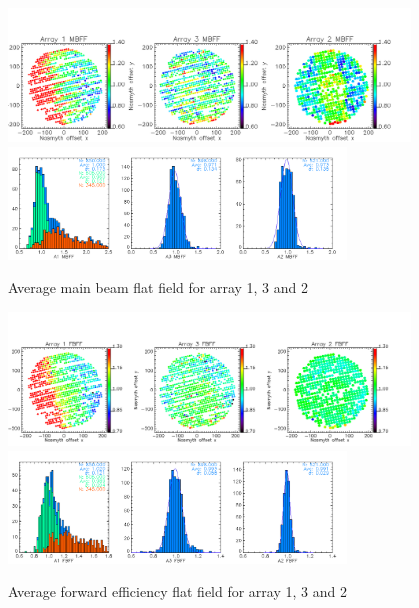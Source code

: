 \begin{figure}[ht] 
\begin{center}
  \includegraphics[width=0.95\textwidth]{Figures/FlatFields/Average_main_beam_flat_field_N2R9_10.png}
  \includegraphics[width=0.8\textwidth]{Figures/FlatFields/Histo_average_main_beam_flat_field_N2R9_10.png}
\caption{Average main beam flat field for array 1, 3 and 2}
 \label{fig:avg_mbff}
\end{center}
\end{figure}

\begin{figure}[ht] 
\begin{center}
  \includegraphics[width=0.95\textwidth]{Figures/FlatFields/Average_near_beam_flat_field_N2R9_10.png}
  \includegraphics[width=0.8\textwidth]{Figures/FlatFields/Histo_average_near_beam_flat_field_N2R9_10.png}
\caption{Average forward efficiency flat field for array 1, 3 and 2}
 \label{fig:avg_fbff}
\end{center}
\end{figure}

